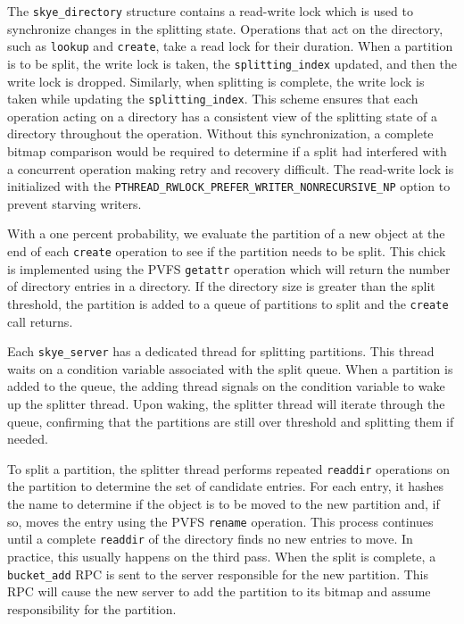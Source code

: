 \documentclass[twocolumn,letterpaper]{article}
\newcommand{\code}[1]{\texttt{#1}}
\begin{document}
The \code{skye\_directory} structure contains a read-write lock which is used
to synchronize changes in the splitting state.  Operations that act on the
directory, such as \code{lookup} and \code{create}, take a read lock for their
duration.  When a partition is to be split, the write lock is taken, the
\code{splitting\_index} updated, and then the write lock is dropped.
Similarly, when splitting is complete, the write lock is taken while updating
the \code{splitting\_index}.  This scheme ensures that each operation acting
on a directory has a consistent view of the splitting state of a directory
throughout the operation.  Without this synchronization, a complete bitmap
comparison would be required to determine if a split had interfered with a
concurrent operation making retry and recovery difficult.  The read-write lock
is initialized with the
\code{PTHREAD\_RWLOCK\_PREFER\_WRITER\_NONRECURSIVE\_NP} option to prevent
starving writers.

With a one percent probability, we evaluate the partition of a new object at
the end of each \code{create} operation to see if the partition needs to be
split.  This chick is implemented using the PVFS \code{getattr} operation
which will return the number of directory entries in a directory.  If the
directory size is greater than the split threshold, the partition is added to
a queue of partitions to split and the \code{create} call returns.

Each \code{skye\_\-server} has a dedicated thread for splitting partitions.
This thread waits on a condition variable associated with the split queue.
When a partition is added to the queue, the adding thread signals on the
condition variable to wake up the splitter thread.  Upon waking, the splitter
thread will iterate through the queue, confirming that the partitions are
still over threshold and splitting them if needed.

To split a partition, the splitter thread performs repeated \code{readdir}
operations on the partition to determine the set of candidate entries.  For
each entry, it hashes the name to determine if the object is to be moved to
the new partition and, if so, moves the entry using the PVFS \code{rename}
operation.  This process continues until a complete \code{readdir} of the
directory finds no new entries to move.  In practice, this usually happens on
the third pass.  When the split is complete, a \code{bucket\_\-add} RPC is
sent to the server responsible for the new partition.  This RPC will cause the
new server to add the partition to its bitmap and assume responsibility for
the partition.
\end{document}
